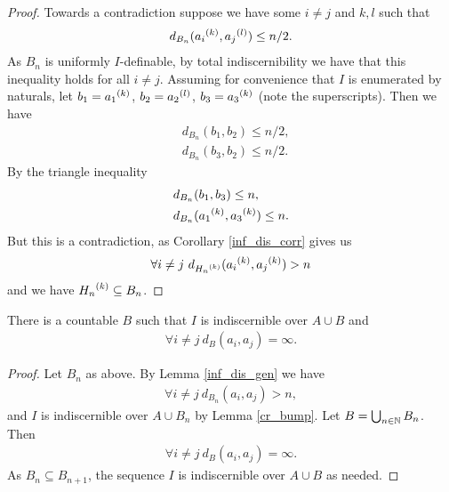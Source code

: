 \begin{proof}
  Towards a contradiction suppose we have some $i \neq j$ and $k, l$ such that
  \begin{align*}
    d_{B_n}({a_i}^{(k)}, {a_j}^{(l)}) \leq n/2.
  \end{align*}
  As $B_n$ is uniformly $I$-definable, by total indiscernibility we have that this inequality holds for all $i \neq j$.
  Assuming for convenience that $I$ is enumerated by naturals, let $b_1 = {a_1}^{(k)}$, $b_2 = {a_2}^{(l)}$, $b_3 = {a_3}^{(k)}$
  (note the superscripts).
  Then we have
  \begin{align*}
    &d_{B_n}(b_1, b_2) \leq n/2, \\
    &d_{B_n}(b_3, b_2) \leq n/2.
  \end{align*}
  By the triangle inequality
  \begin{align*}
    &d_{B_n}(b_1, b_3) \leq n, \\
    &d_{B_n}({a_1}^{(k)}, {a_3}^{(k)}) \leq n.
  \end{align*}
  But this is a contradiction, as Corollary \ref{inf_dis_corr} gives us
  \begin{align*}
    \forall i \neq j \ d_{{H_n}^{(k)}}({a_i}^{(k)}, {a_j}^{(k)}) > n
  \end{align*}
  and we have ${H_n}^{(k)} \subseteq B_n$.
\end{proof}

\begin{Corollary} \label{inf_dis}
  There is a countable $B$ such that $I$ is indiscernible over $A \cup B$ and
  \begin{align*}
    \forall i \neq j \ d_B(a_i, a_j) = \infty.
  \end{align*}
\end{Corollary}

\begin{proof}
  Let $B_n$ as above. By Lemma \ref{inf_dis_gen} we have 
  \begin{align*}
    \forall i \neq j \ d_{B_n}(a_i, a_j) > n,
  \end{align*}
  and $I$ is indiscernible over $A \cup B_n$ by Lemma \ref{cr_bump}.
  Let $B = \bigcup_{n \in \mathbb{N}} B_n$.
  Then
  \begin{align*}
    \forall i \neq j \ d_{B}(a_i, a_j) = \infty.
  \end{align*}
  As $B_n \subseteq B_{n+1}$, the sequence $I$ is indiscernible over $A \cup B$ as needed.
\end{proof}

